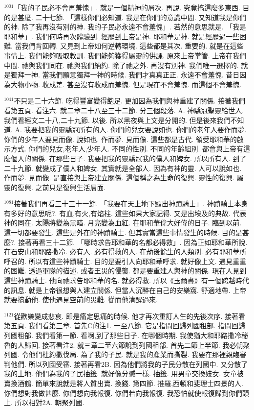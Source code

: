 \documentclass{book}
\begin{document}
$^{1001}$「我的子民必不會再羞愧」.
就是一個精神的層次.
再說.
究竟搞這麼多東西.
目的是甚麼.
二十七節.
「這樣你們必知道.
我是在你們的意識中間.
又知道我是你們的神.
除了我再沒有別的神.
我的子民必永遠不會羞愧」.
若然的意思就是.
「我是耶和華」.
我們何時再次體驗到.
經歷到上帝是神.
耶和華是神.
就是經歷過一些困難.
當我們肯回轉.
又見到上帝如何逆轉環境.
這些都是其次.
重要的.
就是在這些事情上.
我們能夠吸取教訓.
我們能夠獲得屬靈的供課.
原來上帝掌管.
上帝在我們中間.
祂與我們同在.
祂與我們納約.
除了祂之外.
再沒有別神.
我們唯一選擇的.
就是獨拜一神.
當我們願意獨拜一神的時候.
我們才真真正正.
永遠不會羞愧.
昔日因為大物小物.
收成差.
甚至沒有收成而羞愧.
但是現在不會羞愧.
而這個不會羞愧.

$^{1041}$不只是二十六節.
吃得豐富變得飽足.
更加因為我們與神重建了關係.
接著我們看第五頁.
看注六.
就二章二十八至三十二節.
分三個段落.
A. 神驕冠聖靈給世人.
我們看經文二十八,二十九節.
以後.
所以黑夜與上文是分開的.
但是後來我們不知道.
A. 我要把我的靈驕冠所有的人.
你們的兒女要說如也.
你們的老年人要作而夢.
你們的少年人要見而像.
說如也.
作而夢.
見而像.
這些都是古代.
領受耶和華的啟示方式.
你們的兒女,老年人,少年人.
不同的性別.
不同的年齡組別.
都會與上帝有這麼個人的關係.
在那些日子.
我要把我的靈驕冠我的僕人和婢女.
所以所有人.
到了二十九節.
就變成了僕人和婢女.
其實就是全部人.
因為有神的靈.
人可以說如也.
作而夢.
見而像.
是直接與上帝建立關係.
這個稱之為生命的復興.
靈性的復興.
屬靈的復興.
之前只是復興生活層面.

$^{1081}$接著我們再看三十三十一節.
「我要在天上地下顯出神蹟騎士」.
神蹟騎士本身有多好的意思呢?.
有血,有火,有焰柱.
這些如果大家記得.
又是出埃及的典故.
代表神的同在.
太陽將變為黑暗.
月亮變為血紅.
在耶和華偉大好偉的日子.
臨到以前.
這一切都要發生.
這些是外在的神蹟騎士.
但其實當這些事情發生的時候.
目的是甚麼?.
接著再看三十二節.
「哪時求告耶和華的名都必得救」.
因為正如耶和華所說.
在石安山和耶路撒冷.
必有人.
必有得救的人.
在劫後餘生的人類別.
必有耶和華所呼召的.
所以有這些神蹟騎士.
目的是要引人向耶和華呼求.
就好像上文.
遇見重重的困難.
透過軍隊的描述.
或者王災的侵襲.
都是要重建人與神的關係.
現在人見到這些神蹟騎士.
他向祂求告耶和華的名.
就必得救.
所以《玉爾書》有一個跨越時代的訊息.
就是上帝很想與人建立關係.
但當人沉醉在自己的安樂窩.
舒適地帶.
上帝就要搞動他.
使他遇見空前的災難.
從而他清醒過來.

$^{1121}$從歡樂變成悲哀.
即是痛定思痛的時候.
他才再次重訂人生的先後次序.
接著看第五頁.
我們看第三章.
首先C的注1.
一至八節.
它是指問回歸列國租部.
指問回歸列國租部.
我們看第一節.
看啊,到了那些日子.
在哪個時期.
我使猶大和耶路撒冷秘魯的人歸回.
接著看注2.
就三章二至六節說到列國租部.
首先二節上半節.
我必朝聚列國.
令他們杜約撒伐局.
為了我的子民.
就是我的產業而撕裂.
我要在那裡親臨審判他們.
所以列國受審.
接著再看2B.
因為他們將我的子民分散在列國中.
又分散了我的土地.
他們為我的子民抽籤.
就好像分贓一樣.
抽籤.
用男童交換妓女.
女童被賣換酒鶴.
簡單來說就是將人質出賣.
換錢.
第四節.
推羅,西頓和斐理士四景的人.
你們想對我做甚麼.
你們想向我報復.
你們若向我報復.
我恐怕就使報復歸到你們頭上.
所以相對2A.
朝聚列國.
\end{document}
